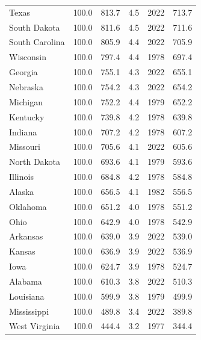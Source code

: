 \begin{longtable}{llllrl}
Texas & 100.0 & 813.7 & 4.5 & 2022 & 713.7 \\
South Dakota & 100.0 & 811.6 & 4.5 & 2022 & 711.6 \\
South Carolina & 100.0 & 805.9 & 4.4 & 2022 & 705.9 \\
Wisconsin & 100.0 & 797.4 & 4.4 & 1978 & 697.4 \\
Georgia & 100.0 & 755.1 & 4.3 & 2022 & 655.1 \\
Nebraska & 100.0 & 754.2 & 4.3 & 2022 & 654.2 \\
Michigan & 100.0 & 752.2 & 4.4 & 1979 & 652.2 \\
Kentucky & 100.0 & 739.8 & 4.2 & 1978 & 639.8 \\
Indiana & 100.0 & 707.2 & 4.2 & 1978 & 607.2 \\
Missouri & 100.0 & 705.6 & 4.1 & 2022 & 605.6 \\
North Dakota & 100.0 & 693.6 & 4.1 & 1979 & 593.6 \\
Illinois & 100.0 & 684.8 & 4.2 & 1978 & 584.8 \\
Alaska & 100.0 & 656.5 & 4.1 & 1982 & 556.5 \\
Oklahoma & 100.0 & 651.2 & 4.0 & 1978 & 551.2 \\
Ohio & 100.0 & 642.9 & 4.0 & 1978 & 542.9 \\
Arkansas & 100.0 & 639.0 & 3.9 & 2022 & 539.0 \\
Kansas & 100.0 & 636.9 & 3.9 & 2022 & 536.9 \\
Iowa & 100.0 & 624.7 & 3.9 & 1978 & 524.7 \\
Alabama & 100.0 & 610.3 & 3.8 & 2022 & 510.3 \\
Louisiana & 100.0 & 599.9 & 3.8 & 1979 & 499.9 \\
Mississippi & 100.0 & 489.8 & 3.4 & 2022 & 389.8 \\
West Virginia & 100.0 & 444.4 & 3.2 & 1977 & 344.4 \\

\end{longtable}
